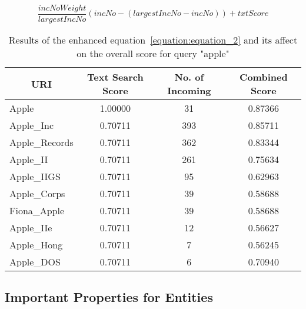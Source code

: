 \begin{equation}\label{equation:equation_2}
\frac{incNoWeight}{largestIncNo} \left ( incNo - \left ( largestIncNo - incNo \right ) \right )  + txtScore
\end{equation}

\begin{table}
\centering
\begin{tabular}{|l|c|c|c|}
\hline
\multicolumn{1}{|c|}{{\bf URI}} & {\bf Text Search Score} & {\bf No. of Incoming} & {\bf Combined Score} \\ \hline
Apple                           & 1.00000                 & 31                    & 0.87366              \\ \hline
Apple\_Inc                      & 0.70711                 & 393                   & 0.85711              \\ \hline
Apple\_Records                  & 0.70711                 & 362                   & 0.83344              \\ \hline
Apple\_II                       & 0.70711                 & 261                   & 0.75634              \\ \hline
Apple\_IIGS                     & 0.70711                 & 95                    & 0.62963              \\ \hline
Apple\_Corps                    & 0.70711                 & 39                    & 0.58688              \\ \hline
Fiona\_Apple                    & 0.70711                 & 39                    & 0.58688              \\ \hline
Apple\_IIe                      & 0.70711                 & 12                    & 0.56627              \\ \hline
Apple\_Hong                     & 0.70711                 & 7                     & 0.56245              \\ \hline
Apple\_DOS                      & 0.70711                 & 6                     & 0.70940              \\ \hline
\end{tabular}
\caption{Results of the enhanced equation~\ref{equation:equation_2} and its affect on the overall score for query "apple"}
\label{tab:text_search_combined_incoming_associations_enhanced}
\end{table}

\subsection{Important Properties for Entities}\label{Section:EKG}

